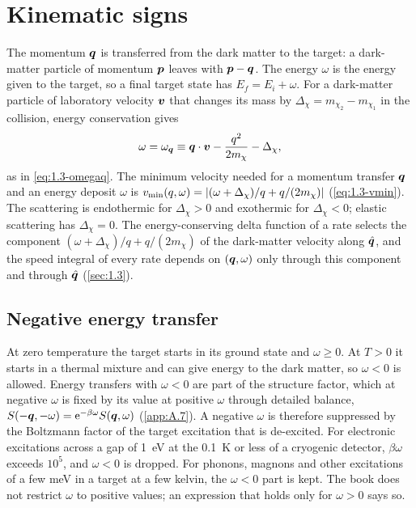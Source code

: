 \section{Kinematic signs}\label{app:A.4}

The momentum $\bm{q}$ is transferred from the dark matter to the target: a dark-matter particle of momentum $\bm{p}$ leaves with $\bm{p} - \bm{q}$. The energy $\omega$ is the energy given to the target, so a final target state has $E_f = E_i + \omega$. For a dark-matter particle of laboratory velocity $\bm{v}$ that changes its mass by $\Delta_\chi = m_{\chi_2} - m_{\chi_1}$ in the collision, energy conservation gives
\begin{equation}
  \omega = \omega_{\bm{q}} \equiv \bm{q}\cdot\bm{v} - \frac{q^2}{2m_\chi} - \Delta_\chi ,
  \label{eq:A.4-omegaq}
\end{equation}
as in \cref{eq:1.3-omegaq}. The minimum velocity needed for a momentum transfer $\bm{q}$ and an energy deposit $\omega$ is $v_{\mathrm{min}}(q,\omega) = |(\omega + \Delta_\chi)/q + q/(2m_\chi)|$ (\cref{eq:1.3-vmin}). The scattering is endothermic for $\Delta_\chi > 0$ and exothermic for $\Delta_\chi < 0$; elastic scattering has $\Delta_\chi = 0$. The energy-conserving delta function of a rate selects the component $(\omega + \Delta_\chi)/q + q/(2m_\chi)$ of the dark-matter velocity along $\hat{\bm{q}}$, and the speed integral of every rate depends on $(\bm{q},\omega)$ only through this component and through $\hat{\bm{q}}$ (\cref{sec:1.3}).

\subsection{Negative energy transfer}

At zero temperature the target starts in its ground state and $\omega \ge 0$. At $T > 0$ it starts in a thermal mixture and can give energy to the dark matter, so $\omega < 0$ is allowed. Energy transfers with $\omega < 0$ are part of the structure factor, which at negative $\omega$ is fixed by its value at positive $\omega$ through detailed balance, $S(-\bm{q},-\omega) = \mathrm{e}^{-\beta\omega}S(\bm{q},\omega)$ (\cref{app:A.7}). A negative $\omega$ is therefore suppressed by the Boltzmann factor of the target excitation that is de-excited. For electronic excitations across a gap of \SI{1}{eV} at the \SI{0.1}{K} or less of a cryogenic detector, $\beta\omega$ exceeds $10^5$, and $\omega < 0$ is dropped. For phonons, magnons and other excitations of a few meV in a target at a few kelvin, the $\omega < 0$ part is kept. The book does not restrict $\omega$ to positive values; an expression that holds only for $\omega > 0$ says so.

